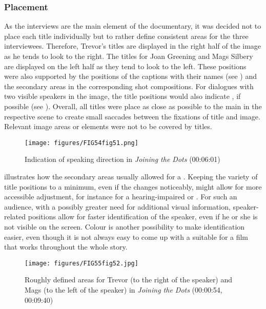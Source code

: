 \subsubsection{Placement}\label{sec:7.5.3.2}

As the interviews are the main element of the documentary, it was decided not to place each title individually but to rather define consistent areas for the three interviewees. Therefore, Trevor’s titles are displayed in the right half of the image as he tends to look to the right. The titles for Joan Greening and Mags Silbery are displayed on the left half as they tend to look to the left. These positions were also supported by the positions of the captions with their names (see ) and the secondary areas in the corresponding shot compositions. For dialogues with two visible speakers in the image, the title positions would also indicate , if possible (see ). Overall, all titles were place as close as possible to the main  in the respective scene to create small saccades between the fixations of title and image. Relevant image areas or elements were not to be covered by titles.

\begin{figure}
\texttt{[image: figures/FIG54fig51.png]}
\caption{Indication of speaking direction in \textit{Joining the Dots} (00:06:01)}
\label{fig:FIG54fig51}
\end{figure}

 illustrates how the secondary areas usually allowed for a . Keeping the variety of title positions to a minimum, even if the  changes noticeably, might allow for more accessible adjustment, for instance for a hearing-impaired or . For such an audience, with a possibly greater need for additional visual information, speaker-related positions allow for faster identification of the speaker, even if he or she is not visible on the screen. Colour is another possibility to make identification easier, even though it is not always easy to come up with a suitable  for a film that works throughout the whole story.

\begin{figure}[t]
\texttt{[image: figures/FIG55fig52.jpg]}
\caption{Roughly defined areas for Trevor (to the right of the speaker) and Mags (to the left of the speaker) in \textit{Joining the Dots} (00:00:54, 00:09:40)}
\label{fig:FIG55fig52}
\end{figure}

